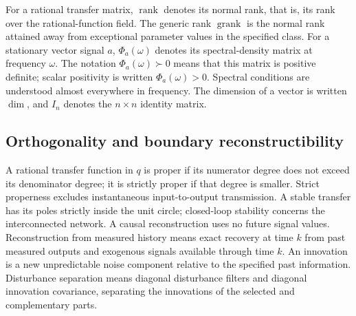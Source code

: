\documentclass[11pt,a4paper]{article}
\newcommand{\grank}{\operatorname{grank}}
\newcommand{\specmat}[1]{\Phi_{#1}}
\newcommand{\rank}{\operatorname{rank}}
\begin{document}
For a rational transfer matrix, $\rank$ denotes its normal rank, that is, its rank over the rational-function field.  The generic rank $\grank$ is the normal rank attained away from exceptional parameter values in the specified class.  For a stationary vector signal $a$, $\specmat{a}(\omega)$ denotes its spectral-density matrix at frequency $\omega$.  The notation $\specmat{a}(\omega)\succ0$ means that this matrix is positive definite; scalar positivity is written $\specmat{a}(\omega)>0$.  Spectral conditions are understood almost everywhere in frequency.  The dimension of a vector is written $\dim$, and $I_n$ denotes the $n\times n$ identity matrix.

\subsection{Orthogonality and boundary reconstructibility}
\label{sec:orthogonality-definitions}

A rational transfer function in $q$ is proper if its numerator degree does not exceed its denominator degree; it is strictly proper if that degree is smaller.  Strict properness excludes instantaneous input-to-output transmission.  A stable transfer has its poles strictly inside the unit circle; closed-loop stability concerns the interconnected network.  A causal reconstruction uses no future signal values.  Reconstruction from measured history means exact recovery at time $k$ from past measured outputs and exogenous signals available through time $k$.  An innovation is a new unpredictable noise component relative to the specified past information.  Disturbance separation means diagonal disturbance filters and diagonal innovation covariance, separating the innovations of the selected and complementary parts.
\end{document}

